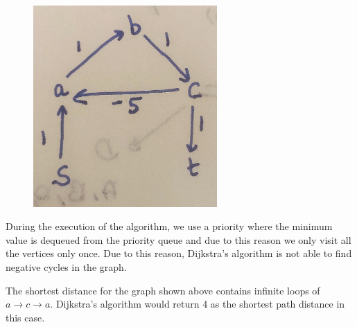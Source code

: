 \documentclass[12pt,a4paper]{article}
\begin{document}
\begin{figure}[H]
    \centering
    \includegraphics[width=7cm]{prob_7.jpg}
\end{figure}

During the execution of the algorithm, we use a priority where the minimum value is dequeued from the priority queue and due to this reason we only visit all the vertices only once. Due to this reason, Dijkstra's algorithm is not able to find negative cycles in the graph.

The shortest distance for the graph shown above contains infinite loops of $a \rightarrow c \rightarrow a$. Dijkstra's algorithm would return 4 as the shortest path distance in this case.
\end{document}
